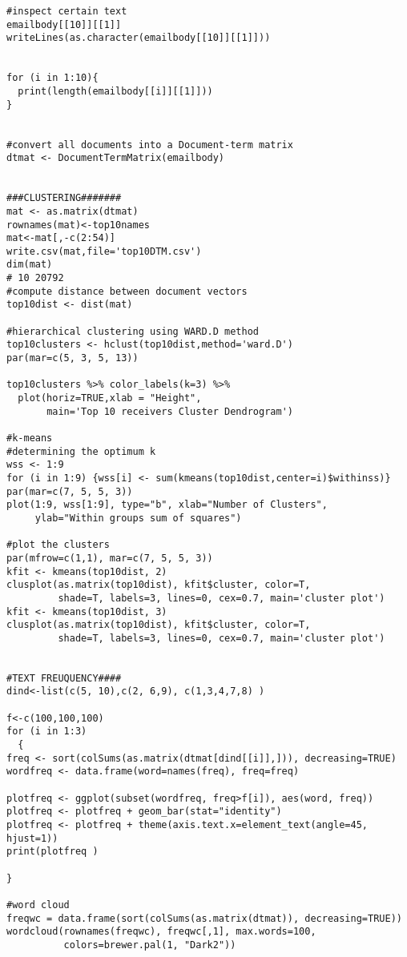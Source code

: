 \begin{verbatim}
#inspect certain text 
emailbody[[10]][[1]]
writeLines(as.character(emailbody[[10]][[1]]))


for (i in 1:10){
  print(length(emailbody[[i]][[1]]))
}


#convert all documents into a Document-term matrix
dtmat <- DocumentTermMatrix(emailbody)


###CLUSTERING#######
mat <- as.matrix(dtmat)
rownames(mat)<-top10names
mat<-mat[,-c(2:54)]
write.csv(mat,file='top10DTM.csv')
dim(mat)
# 10 20792
#compute distance between document vectors
top10dist <- dist(mat)

#hierarchical clustering using WARD.D method
top10clusters <- hclust(top10dist,method='ward.D')
par(mar=c(5, 3, 5, 13))

top10clusters %>% color_labels(k=3) %>% 
  plot(horiz=TRUE,xlab = "Height", 
       main='Top 10 receivers Cluster Dendrogram')

#k-means
#determining the optimum k
wss <- 1:9
for (i in 1:9) {wss[i] <- sum(kmeans(top10dist,center=i)$withinss)}
par(mar=c(7, 5, 5, 3))
plot(1:9, wss[1:9], type="b", xlab="Number of Clusters",
     ylab="Within groups sum of squares")

#plot the clusters
par(mfrow=c(1,1), mar=c(7, 5, 5, 3))
kfit <- kmeans(top10dist, 2)
clusplot(as.matrix(top10dist), kfit$cluster, color=T, 
         shade=T, labels=3, lines=0, cex=0.7, main='cluster plot')
kfit <- kmeans(top10dist, 3)
clusplot(as.matrix(top10dist), kfit$cluster, color=T, 
         shade=T, labels=3, lines=0, cex=0.7, main='cluster plot')


#TEXT FREUQUENCY####
dind<-list(c(5, 10),c(2, 6,9), c(1,3,4,7,8) )

f<-c(100,100,100)
for (i in 1:3)
  {
freq <- sort(colSums(as.matrix(dtmat[dind[[i]],])), decreasing=TRUE)   
wordfreq <- data.frame(word=names(freq), freq=freq)   

plotfreq <- ggplot(subset(wordfreq, freq>f[i]), aes(word, freq))    
plotfreq <- plotfreq + geom_bar(stat="identity")   
plotfreq <- plotfreq + theme(axis.text.x=element_text(angle=45, hjust=1))   
print(plotfreq )

}

#word cloud
freqwc = data.frame(sort(colSums(as.matrix(dtmat)), decreasing=TRUE))
wordcloud(rownames(freqwc), freqwc[,1], max.words=100, 
          colors=brewer.pal(1, "Dark2"))
\end{verbatim}